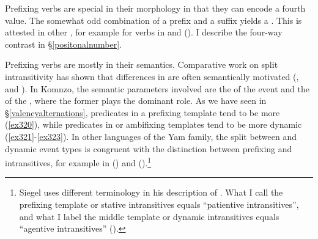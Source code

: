   
Prefixing verbs are special in their morphology in that they can encode a fourth  value. The somewhat odd combination of a  prefix and a  suffix yields a . This is attested in other , for example for  verbs in  and  (\citealt{Evans:2014bz}). I describe the four-way  contrast in {\S}\ref{positonalnumber}.

Prefixing verbs are mostly  in their semantics. Comparative work on split intransitivity has shown that differences in  are often semantically motivated (\citealt{Merlan:1985tu}, \citealt{Mithun:1991wu} and \citealt{Arkadiev:2008vq}). In Komnzo, the semantic parameters involved are the  of the event and the  of the , where the former plays the dominant role. As we have seen in \S\ref{valencyalternations}, predicates in a prefixing template tend to be more  (\ref{ex320}), while predicates in  or ambifixing templates tend to be more dynamic (\ref{ex321}-\ref{ex323}). In other languages of the Yam family, the split between  and dynamic event types is congruent with the distinction between prefixing and  intransitives, for example in  (\citealt{Evans:2015to}) and  (\citealt{Siegel:2015bp}).\footnote{Siegel uses different terminology in his description of . What I call the prefixing template or stative intransitives equals ``patientive intransitives'', and what I label the middle template or dynamic intransitives equals ``agentive intransitives'' (\citealt[213]{Siegel:2015bp}).}

